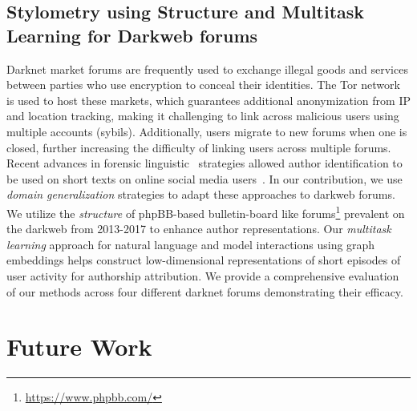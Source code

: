 \subsection{Stylometry using Structure and Multitask Learning for Darkweb forums}
Darknet market forums are frequently used to exchange illegal goods and services between parties who use encryption to conceal their identities.
The Tor network is used to host these markets, which guarantees additional anonymization from IP and location tracking, making it challenging to link across malicious users using multiple accounts (sybils).
Additionally, users migrate to new forums when one is closed, further increasing the difficulty of linking users across multiple forums. 
Recent advances in forensic linguistic~\citep{juola2008authorship} strategies allowed  author identification to be used on short texts on online social media users~\citep{shrestha2017convolutional,andrews2019learning}.
In our contribution, we use \textit{domain generalization} strategies to adapt these approaches to darkweb forums.
We utilize the \textit{structure} of phpBB-based bulletin-board like forums\footnote{\url{https://www.phpbb.com/}} prevalent on the darkweb from 2013-2017 to enhance author representations.
Our \textit{multitask learning} approach for natural language and model interactions using graph embeddings helps construct low-dimensional representations of short episodes of user activity for authorship attribution. 
We provide a comprehensive evaluation of our methods across four different darknet forums demonstrating their efficacy.


\section{Future Work}

